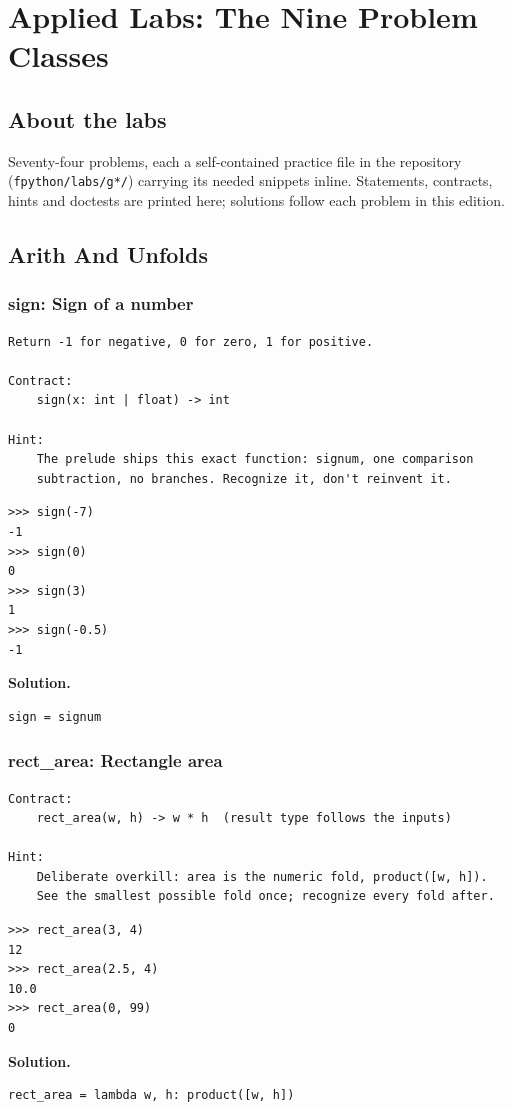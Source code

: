 \documentclass[10pt,letterpaper]{book}
\begin{document}
\clearpage
\part{Applied Labs: The Nine Problem Classes}
\chapter*{About the labs}
Seventy-four problems, each a self-contained practice file in the repository
(\texttt{fpython/labs/g*/}) carrying its needed snippets inline. Statements,
contracts, hints and doctests are printed here; solutions follow each problem in this edition.
\chapter{Arith And Unfolds}

\section{sign: Sign of a number}
\begin{lstlisting}[style=ex]
Return -1 for negative, 0 for zero, 1 for positive.

Contract:
    sign(x: int | float) -> int

Hint:
    The prelude ships this exact function: signum, one comparison
    subtraction, no branches. Recognize it, don't reinvent it.
\end{lstlisting}
\begin{lstlisting}[style=ex]
>>> sign(-7)
-1
>>> sign(0)
0
>>> sign(3)
1
>>> sign(-0.5)
-1
\end{lstlisting}
\noindent\textbf{Solution.}
\begin{lstlisting}[style=code]
sign = signum
\end{lstlisting}

\section{rect\_area: Rectangle area}
\begin{lstlisting}[style=ex]
Contract:
    rect_area(w, h) -> w * h  (result type follows the inputs)

Hint:
    Deliberate overkill: area is the numeric fold, product([w, h]).
    See the smallest possible fold once; recognize every fold after.
\end{lstlisting}
\begin{lstlisting}[style=ex]
>>> rect_area(3, 4)
12
>>> rect_area(2.5, 4)
10.0
>>> rect_area(0, 99)
0
\end{lstlisting}
\noindent\textbf{Solution.}
\begin{lstlisting}[style=code]
rect_area = lambda w, h: product([w, h])
\end{lstlisting}
\end{document}
